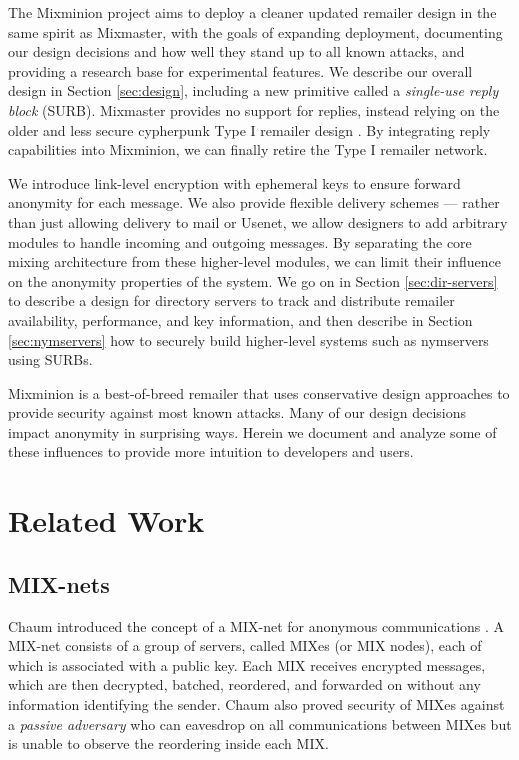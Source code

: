 \documentclass{llncs}
\begin{document}
The Mixminion project aims to deploy a cleaner updated remailer design
in the same spirit as Mixmaster, with the goals of expanding deployment,
documenting our design decisions and how well they stand up to all known
attacks, and providing a research base for experimental features. We
describe our overall design in Section \ref{sec:design}, including
a new primitive called a \emph{single-use reply block}
(SURB).  Mixmaster provides no support for replies, instead relying
on the older and less secure cypherpunk Type I remailer design
\cite{remailer-history}. By integrating reply capabilities into
Mixminion, we can finally retire the Type I remailer network.

We introduce link-level encryption with ephemeral keys to ensure forward
anonymity for each message. We also provide flexible delivery schemes ---
rather than just allowing delivery to mail or Usenet, we allow designers
to add arbitrary modules to handle incoming and outgoing messages. By
separating the core mixing architecture from these higher-level modules,
we can limit their influence on the anonymity properties of the system. We
go on in Section \ref{sec:dir-servers} to describe a design for directory
servers to track and distribute remailer availability, performance,
and key information, and then describe in Section \ref{sec:nymservers}
how to securely build higher-level systems such as nymservers using SURBs.

Mixminion is a best-of-breed remailer that uses conservative
design approaches to provide security against most known attacks.
Many of our design decisions impact anonymity in surprising ways. Herein
we document and analyze some of these influences to provide more intuition
to developers and users.


\section{Related Work}

\subsection{MIX-nets}

Chaum introduced the concept of a MIX-net for anonymous communications
\cite{chaum-mix}. A MIX-net consists of a group of servers, called MIXes
(or MIX nodes), each of which is associated with a public key. Each
MIX receives encrypted messages, which are then decrypted, batched,
reordered, and forwarded on without any information identifying the
sender. Chaum also proved security of MIXes against a \emph{passive
adversary} who can eavesdrop on all communications between MIXes but is
unable to observe the reordering inside each MIX.
\end{document}
